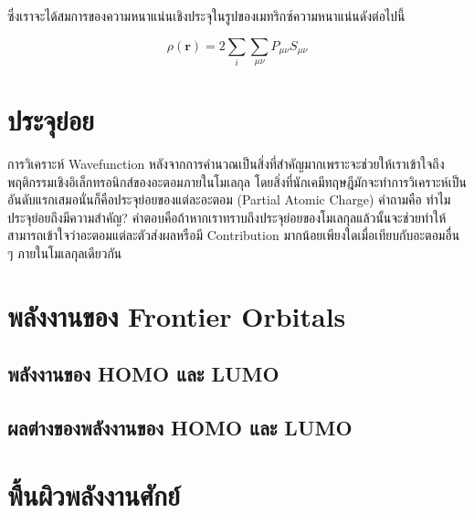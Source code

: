 \noindent ซึ่งเราจะได้สมการของความหนาแน่นเชิงประจุในรูปของเมทริกซ์ความหนาแน่นดังต่อไปนี้

\begin{equation}\label{eq:charge_density_matrix}
    \rho (\mathbf{r}) = 2 \sum_{i} \sum_{\mu\nu} P_{\mu\nu}S_{\mu\nu}
\end{equation}

\section{ประจุย่อย}
\label{sec:partial_charge}

การวิเคราะห์ Wavefunction หลังจากการคำนวณเป็นสิ่งที่สำคัญมากเพราะจะช่วยให้เราเข้าใจถึงพฤติกรรมเชิงอิเล็กทรอนิกส์ของอะตอมภายในโมเลกุล 
โดยสิ่งที่นักเคมีทฤษฎีมักจะทำการวิเคราะห์เป็นอันดับแรกเสมอนั่นก็คือประจุย่อยของแต่ละอะตอม (Partial Atomic Charge) คำถามคือ 
ทำไมประจุย่อยถึงมีความสำคัญ? คำตอบคือถ้าหากเราทราบถึงประจุย่อยของโมเลกุลแล้วนั้นจะช่วยทำให้สามารถเข้าใจว่าอะตอมแต่ละตัวส่งผลหรือมี 
Contribution มากน้อยเพียงใดเมื่อเทียบกับอะตอมอื่น ๆ ภายในโมเลกุลเดียวกัน

\section{พลังงานของ Frontier Orbitals}
\label{sec:ener_orb}



\subsection{พลังงานของ HOMO และ LUMO}
\label{ssec:ener_homo_lumo}



\subsection{ผลต่างของพลังงานของ HOMO และ LUMO}
\label{sec:ener_diff_orb}


\section{พื้นผิวพลังงานศักย์}
\label{sec:pef}

